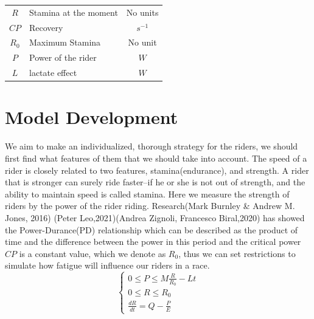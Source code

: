 \documentclass[12pt]{article}
\begin{document}
\begin{center}
{\begin{tabular}{clc}
            $R$           & Stamina at the moment                                   & \quad No units    \\[0.25cm]
            $CP$          & Recovery                                                & \quad $s^{-1}$    \\[0.25cm]
            $R_0$         & Maximum Stamina                                         & \quad No unit     \\[0.25cm]
            $P$           & Power of the rider                                      & \quad $W$         \\[0.25cm]
            $L$           & lactate effect                                          & \quad $W$         \\[0.25cm]
        \end{tabular}
    }
\end{center}
\section{Model Development}
We aim to make an individualized, thorough strategy for the riders, we should first find what features of them that we should take into account.
The speed of a rider
is closely related to two features, stamina(endurance), and strength. A rider that is stronger can surely ride faster--if he or she is not out of strength, and the ability
to maintain speed is called stamina.
Here we measure the strength of riders by the power of the rider riding. Research(Mark Burnley \& Andrew M. Jones, 2016)\cite{doi:10.1080/17461391.2016.1249524}
(Peter Leo,2021)\cite{leo2021power}(Andrea Zignoli, Francesco Biral,2020)\cite{zignoli2020prediction}
has showed the Power-Durance(PD) relationship
which can be described as the product of time and the difference between the power in this period and the critical power $CP$ is a constant value, which we
denote as $R_0$,  thus we can  set restrictions  to simulate how fatigue will influence our riders in a race.
\begin{equation}
    \left\{
    \begin{array}{c}
        0                \leqslant  P  \leqslant  M\frac{R}{R_0}-Lt \\
        0                \leqslant  R  \leqslant  R_0               \\
        \frac{d R}{d t}  =          Q  -          \frac{P}{E}
    \end{array}
    \right.
\end{equation}
\end{document}

